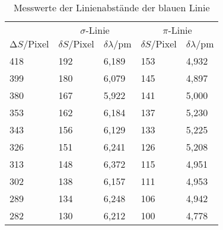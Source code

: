 
\begin{table}[H]
  \centering
  \caption{Messwerte der Linienabstände der blauen Linie}
  \label{tab:tabe3}
  \begin{tabular}{l l l l l}
    \toprule
      & \multicolumn{2}{c}{$\sigma$-Linie} & \multicolumn{2}{c}{$\pi$-Linie} \\
    \cmidrule{2-3} \cmidrule{4-5}

    $ \increment S / \text{Pixel} $ & $ \delta S / \text{Pixel}$ & $ \delta \lambda / \si{\pico\meter}$ &
    $ \delta S / \text{Pixel}$ & $ \delta \lambda / \si{\pico\meter}$\\
    \midrule
    418 & 192 & 6,189 & 153 & 4,932 \\
    399 & 180 & 6,079 & 145 & 4,897 \\
    380 & 167 & 5,922 & 141 & 5,000 \\
    353 & 162 & 6,184 & 137 & 5,230 \\
    343 & 156 & 6,129 & 133 & 5,225 \\
    326 & 151 & 6,241 & 126 & 5,208 \\
    313 & 148 & 6,372 & 115 & 4,951 \\
    302 & 138 & 6,157 & 111 & 4,953 \\
    289 & 134 & 6,248 & 106 & 4,942 \\
    282 & 130 & 6,212 & 100 & 4,778 \\

          \bottomrule
        \end{tabular}
    \end{table}
